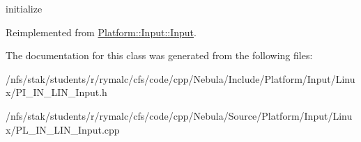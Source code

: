 initialize 

Reimplemented from \hyperlink{classPlatform_1_1Input_1_1Input_afd31cd2634d8f44441ac04fd2b2baf3a}{Platform::Input::Input}.

The documentation for this class was generated from the following files:\begin{DoxyCompactItemize}
\item 
/nfs/stak/students/r/rymalc/cfs/code/cpp/Nebula/Include/Platform/Input/Linux/PI\_\-IN\_\-LIN\_\-Input.h\item 
/nfs/stak/students/r/rymalc/cfs/code/cpp/Nebula/Source/Platform/Input/Linux/PL\_\-IN\_\-LIN\_\-Input.cpp\end{DoxyCompactItemize}
